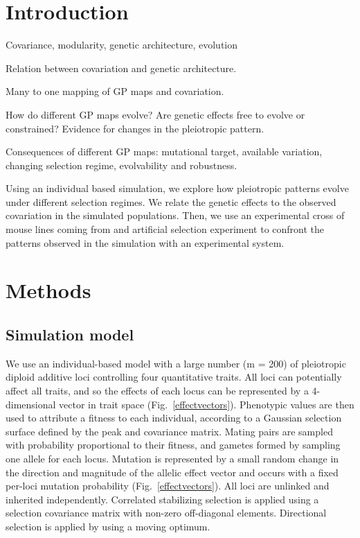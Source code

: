 \begin{refsection}


\section{Introduction}

Covariance, modularity, genetic architecture, evolution

Relation between covariation and genetic architecture.

Many to one mapping of GP maps and covariation.

How do different GP maps evolve? Are genetic effects free to evolve or constrained? Evidence for changes in the pleiotropic pattern. 

Consequences of different GP maps: mutational target, available variation, changing selection regime,
evolvability and robustness.

Using an individual based simulation, we explore how pleiotropic patterns evolve under different selection regimes. We relate the genetic effects to the observed covariation in the simulated populations. Then, we use an experimental cross of mouse lines coming from and artificial selection experiment to confront the patterns observed in the simulation with an experimental system.

\section{Methods}

\subsection{Simulation model}

We use an individual-based model with a large number (m = 200) of pleiotropic
diploid additive loci controlling four quantitative traits. All loci can
potentially affect all traits, and so the effects of each locus can be
represented by a 4-dimensional vector in trait space (Fig.~\ref{effectvectors}).
Phenotypic values are then used to attribute a fitness to each individual,
according to a Gaussian selection surface defined by the peak and covariance
matrix. Mating pairs are sampled with probability proportional to their fitness,
and gametes formed by sampling one allele for each locus. Mutation is
represented by a small random change in the direction and magnitude of the
allelic effect vector and occurs with a fixed per-loci mutation probability
(Fig.~\ref{effectvectors}). All loci are unlinked and inherited independently.
Correlated stabilizing selection is applied using a selection covariance matrix
with non-zero off-diagonal elements. Directional selection is applied by using a
moving optimum.


\end{refsection}
